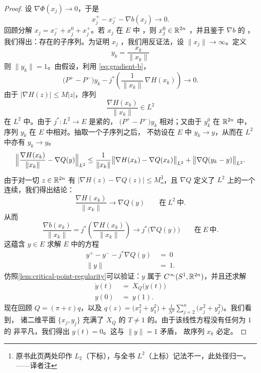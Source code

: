 \begin{proof}
设 $\nabla\Phi(x_{j})\to0$，于是
\begin{equation}\label{eq:gradient-vanishing}
x_{j}^{+}-x_{j}^{-}-\nabla b(x_{j})\to0.
\end{equation}
回顾分解 $x_{j}=x_{j}^{-}+x_{j}^{0}+x_{j}^{+}$。若 $x_{j}$ 在 $E$ 中%
\trBounded，则 $x_{j}^{0}\in\mathbb{R}^{2n}$ \trBounded，并且鉴于 $\nabla b$ 的%
\trCompactness，我们得出：存在\trConverge{}的子序列。为证明 $x_{j}$%
\trBounded，我们用反证法，设 $\|x_{j}\|\to\infty$。定义
\[
y_{k}=\frac{x_{k}}{\|x_{k}\|}
\]
则 $\|y_{k}\|=1$。由假设，利用 \eqref{eq:gradient-b}，
\[
\bigl(P^{+}-P^{-}\bigr)y_{k}-j^{*}\left(\frac{1}{\|x_{k}\|}\,\nabla H(x_{k})\right)%
\to0.
\]
由于 $|\nabla H(z)|\leq M|z|$，序列
\[
\frac{\nabla H(x_{k})}{\|x_{k}\|}\in L^{2}
\]
在 $L^{2}$ 中\trBounded。由于 $j^{*}:L^{2}\to E$ 是紧的，%
$\bigl(P^{+}-P^{-}\bigr)y_{k}$ 相对\trCompact；又由于 $y_{k}^{0}$ 在 $\mathbb{R}^{2n}$%
中\trBounded，序列 $y_{k}$ 在 $E$ 中相对\trCompact。抽取一个子序列之后，%
不妨设在 $E$ 中 $y_{k}\to y$，从而在 $L^{2}$ 中亦有 $y_{k}\to y$。
\[
\Bigl\|\frac{\nabla H(x_{k})}{\|x_{k}\|}-\nabla Q(y)\Bigr\|_{L^{2}}\leq%
\frac{1}{\|x_{k}\|}\bigl\|\nabla H(x_{k})-\nabla Q(x_{k})\bigr\|_{L^{2}}+%
\bigl\|\nabla Q(y_{k}-y)\bigr\|_{L^{2}}.
\]
由于对一切 $z\in\mathbb{R}^{2n}$ 有 $|\nabla H(z)-\nabla Q(z)|\leq M$\footnote{原书此页两处印作 $L_{2}$（下标），与全书 $L^{2}$（上标）记法不一，此处径归一。——译者注}，且 $\nabla Q$%
定义了 $L^{2}$ 上的一个连续\trLinear\trOperator，我们得出结论：
\[
\frac{\nabla H(x_{k})}{\|x_{k}\|}\to\nabla Q(y)\qquad\text{在}\ L^{2}\ %
\text{中}.
\]
从而
\[
\frac{\nabla b(x_{k})}{\|x_{k}\|}=j^{*}\left(\frac{\nabla H(x_{k})}{\|x_{k}\|}\right)%
\to j^{*}\bigl(\nabla Q(y)\bigr)\qquad\text{在}\ E\ \text{中}.
\]
这蕴含 $y\in E$ 求解 $E$ 中的\trLinear{}方程
\begin{align*}
y^{+}-y^{-}-j^{*}\nabla Q(y)\ &=\ 0\\
\|y\|\ &=\ 1.
\end{align*}
仿照\cref{lem:critical-point-regularity}可以验证：$y$ 属于%
$C^{\infty}(S^{1},\mathbb{R}^{2n})$，并且还求解\trLinear\trHamiltonianEquation
\begin{align*}
\dot{y}(t)\ &=\ X_{Q}\bigl(y(t)\bigr)\\
y(0)\ &=\ y(1).
\end{align*}
现在回顾 $Q=(\pi+\varepsilon)q$，以及 $q(z)=\bigl(x_{1}^{2}+y_{1}^{2}\bigr)+%
\frac{1}{N^{2}}\sum_{j=2}^{n}\bigl(x_{j}^{2}+y_{j}^{2}\bigr)$。我们看到，%
诸\trSymplectic{}二维平面 $\{x_{j},y_{j}\}$ 充满了 $X_Q$ 的\trPeriodic{}%
$T\neq1$ 的\trPeriodicSolution。由于该线性方程没有任何\trPeriodic{}为 $1$ 的%
非平凡\trPeriodicSolution，我们得出 $y(t)=0$。这与 $\|y\|=1$ 矛盾，%
故序列 $x_{k}$ 必定\trBounded。
\end{proof}

